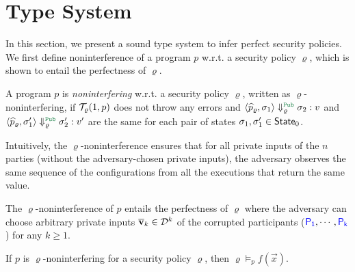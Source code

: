 \section{Type System}\label{sec:typesystem}
In this section, we present a sound type system to infer
perfect security policies.
%
%
We first define noninterference of a program $p$ w.r.t. a security policy $\varrho$,
which is shown to entail the perfectness of $\varrho$.

\begin{definition}
A program $p$ %
is \emph{noninterfering} w.r.t. a security policy $\varrho$, written as $\varrho$-noninterfering,
if $\mathcal{T}_\varrho(1,p)$ does not throw any errors and $\MPCAngle{\widehat{p}_\varrho,\sigma_1}\Downarrow_\varrho^{\Pub} \sigma_2:v$ and $\MPCAngle{\widehat{p}_\varrho,\sigma_1'}\Downarrow_\varrho^{\Pub} \sigma_2':v'$
are the same for each pair of states $\sigma_1,\sigma_1'\in {\sf State}_0$. %
\end{definition}

Intuitively, the $\varrho$-noninterference ensures that for all private inputs of the $n$ parties (without the adversary-chosen private inputs), the adversary observes the same sequence of the configurations from all the executions that return the same value.

The $\varrho$-noninterference of $p$ entails the perfectness of $\varrho$ where
the adversary can choose arbitrary private inputs $\overline{\bf{v}}_k\in\mathcal{D}^k$ of the corrupted participants (${\textcolor{blue}{\sf P_{1}}},\cdots, {\textcolor{blue}{\sf P_{k}}}$)
for any $k\geq 1$.

\begin{proposition}\label{prop:NI2Sec}
If $p$ is $\varrho$-noninterfering for a security policy $\varrho$, then $\varrho\models_p f(\vec{x})$.
\end{proposition}


